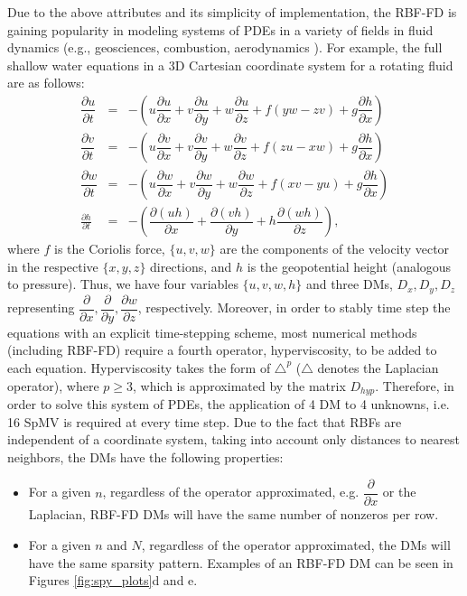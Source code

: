 Due to the above attributes and its simplicity of implementation, the RBF-FD is gaining popularity in modeling systems of PDEs in a variety of fields in fluid dynamics (e.g., geosciences, combustion, aerodynamics \cite{Bayona13,CDNT,FoL11,FLBWSC12,SPLM}). For example, the full shallow water equations in a 3D Cartesian coordinate system for a rotating fluid are as follows:
{
\small
\begin{eqnarray}
\dfrac{\partial u}{\partial t} &=& - \left( u\dfrac{\partial u}{\partial x} + v\dfrac{\partial u}{\partial y} + w\dfrac{\partial u}{\partial z} + f(yw - zv) + g\dfrac{\partial h}{\partial x} \right) 
\nonumber \\
\dfrac{\partial v}{\partial t} &=& - \left( u\dfrac{\partial v}{\partial x} + v\dfrac{\partial v}{\partial y} + w\dfrac{\partial v}{\partial z} + f(zu - xw) + g\dfrac{\partial h}{\partial x} \right)
\nonumber\\
\dfrac{\partial w}{\partial t} &=& - \left( u\dfrac{\partial w}{\partial x} + v\dfrac{\partial w}{\partial y} + w\dfrac{\partial w}{\partial z} + f(xv - yu) + g\dfrac{\partial h}{\partial x} \right)
\nonumber\\
\frac{\partial h}{\partial t}& =&-\left(\dfrac{\partial (uh)}{\partial x} + \dfrac{\partial (vh)}{\partial y} + h\dfrac{\partial (wh)}{\partial z}\right) , \label{height} \nonumber
\end{eqnarray}
} where $f$ is the Coriolis force, $\{u,v,w\}$ are the components of the velocity vector in the respective $\{x,y,z\}$ directions, and $h$ is the geopotential height (analogous to pressure). Thus, we have four variables $\{u,v,w,h\}$ and three DMs, $D_x, D_y, D_z$ representing $\dfrac{\partial}{\partial x}, \dfrac{\partial}{\partial y},\dfrac{\partial w}{\partial z}$, respectively. Moreover, in order to stably time step the equations with an explicit time-stepping scheme, most numerical methods (including RBF-FD) require a fourth operator, hyperviscosity, to be added to each equation. Hyperviscosity takes the form of $\triangle^p$ ($\triangle$ denotes the Laplacian operator), where $p\geq3$, which is approximated by the matrix $D_{hyp}$. Therefore, in order to solve this system of PDEs, the application of 4 DM to 4 unknowns, i.e. 16 SpMV is required at every time step. Due to the fact that RBFs are independent of a coordinate system, taking into account only distances to nearest neighbors, the DMs have the following properties:
\begin{itemize}
\item For a given $n$, regardless of the operator approximated, e.g. $\dfrac{\partial}{\partial x}$ or the Laplacian, RBF-FD DMs will have the same number of nonzeros per row.
\item For a given $n$ and $N$, regardless of the operator approximated, the DMs will have the same sparsity pattern. Examples of an RBF-FD DM can be seen in Figures \ref{fig:spy_plots}d and e.
\end{itemize}

